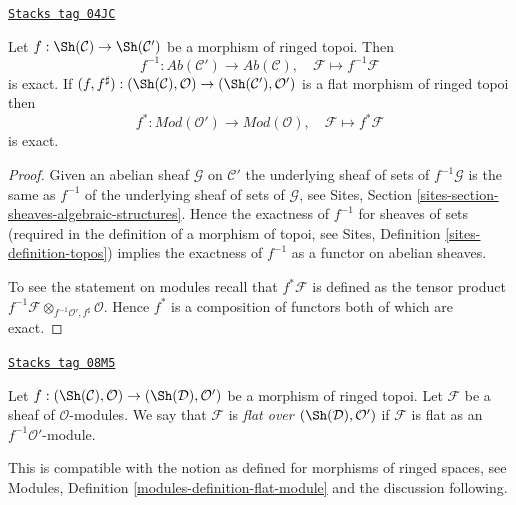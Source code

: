 \begin{lemma}
\label{sites-modules-lemma-flat-pullback-exact}
\href{https://stacks.math.columbia.edu/tag/04JC}{\texttt{Stacks tag 04JC}}

Let $f : \Sh(\mathcal{C}) \to \Sh(\mathcal{C}')$
be a morphism of ringed topoi. Then
$$
f^{-1} : \textit{Ab}(\mathcal{C}') \longrightarrow \textit{Ab}(\mathcal{C}),
\quad
\mathcal{F} \longmapsto f^{-1}\mathcal{F}
$$
is exact. If
$(f, f^\sharp) :
(\Sh(\mathcal{C}), \mathcal{O})
\to
(\Sh(\mathcal{C}'), \mathcal{O}')$
is a flat morphism of ringed topoi then
$$
f^* : \textit{Mod}(\mathcal{O}') \longrightarrow \textit{Mod}(\mathcal{O}),
\quad
\mathcal{F} \longmapsto f^*\mathcal{F}
$$
is exact.
\end{lemma}

\begin{proof}
Given an abelian sheaf $\mathcal{G}$ on $\mathcal{C}'$
the underlying sheaf of sets of $f^{-1}\mathcal{G}$ is the same
as $f^{-1}$ of the underlying sheaf of sets of $\mathcal{G}$, see
Sites, Section \ref{sites-section-sheaves-algebraic-structures}.
Hence the exactness of $f^{-1}$ for sheaves of sets (required in the
definition of a morphism of topoi, see
Sites, Definition \ref{sites-definition-topos})
implies the exactness of $f^{-1}$ as a functor on abelian sheaves.

\medskip\noindent
To see the statement on modules recall that $f^*\mathcal{F}$ is defined
as the tensor product
$f^{-1}\mathcal{F} \otimes_{f^{-1}\mathcal{O}', f^\sharp} \mathcal{O}$.
Hence $f^*$ is a composition of functors both of which are exact.
\end{proof}

\begin{definition}
\label{sites-modules-definition-flat-module}
\href{https://stacks.math.columbia.edu/tag/08M5}{\texttt{Stacks tag 08M5}}

Let $f : (\Sh(\mathcal{C}), \mathcal{O}) \to (\Sh(\mathcal{D}), \mathcal{O}')$
be a morphism of ringed topoi. Let $\mathcal{F}$ be a sheaf of
$\mathcal{O}$-modules. We say that $\mathcal{F}$ is
{\it flat over $(\Sh(\mathcal{D}), \mathcal{O}')$} if
$\mathcal{F}$ is flat as an $f^{-1}\mathcal{O}'$-module.
\end{definition}

This is compatible with the notion as defined for morphisms of ringed spaces,
see Modules, Definition \ref{modules-definition-flat-module}
and the discussion following.

